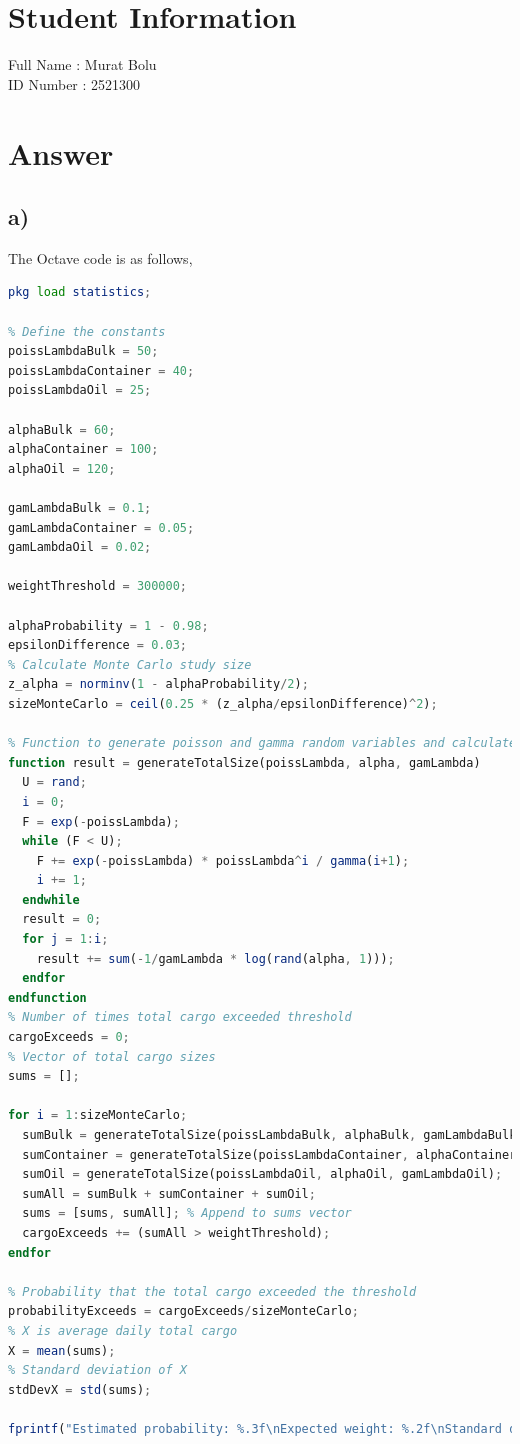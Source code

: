 \documentclass[12pt]{article}
\begin{document}
\section*{Student Information }
Full Name : Murat Bolu \\
ID Number : 2521300 \\

\section*{Answer}

\subsection*{a)}
\noindent
The Octave code is as follows,
\begin{lstlisting}[language=Octave]
% Load statistics module for inverse standard normal distribution
pkg load statistics;

% Define the constants
poissLambdaBulk = 50;
poissLambdaContainer = 40;
poissLambdaOil = 25;

alphaBulk = 60;
alphaContainer = 100;
alphaOil = 120;

gamLambdaBulk = 0.1;
gamLambdaContainer = 0.05;
gamLambdaOil = 0.02;

weightThreshold = 300000;

alphaProbability = 1 - 0.98;
epsilonDifference = 0.03;
% Calculate Monte Carlo study size
z_alpha = norminv(1 - alphaProbability/2);
sizeMonteCarlo = ceil(0.25 * (z_alpha/epsilonDifference)^2);

% Function to generate poisson and gamma random variables and calculate total cargo
function result = generateTotalSize(poissLambda, alpha, gamLambda)
  U = rand;
  i = 0;
  F = exp(-poissLambda);
  while (F < U);
    F += exp(-poissLambda) * poissLambda^i / gamma(i+1);
    i += 1;
  endwhile
  result = 0;
  for j = 1:i;
    result += sum(-1/gamLambda * log(rand(alpha, 1)));
  endfor
endfunction
% Number of times total cargo exceeded threshold
cargoExceeds = 0;
% Vector of total cargo sizes
sums = [];

for i = 1:sizeMonteCarlo;
  sumBulk = generateTotalSize(poissLambdaBulk, alphaBulk, gamLambdaBulk);
  sumContainer = generateTotalSize(poissLambdaContainer, alphaContainer, gamLambdaContainer);
  sumOil = generateTotalSize(poissLambdaOil, alphaOil, gamLambdaOil);
  sumAll = sumBulk + sumContainer + sumOil;
  sums = [sums, sumAll]; % Append to sums vector
  cargoExceeds += (sumAll > weightThreshold);
endfor

% Probability that the total cargo exceeded the threshold
probabilityExceeds = cargoExceeds/sizeMonteCarlo;
% X is average daily total cargo
X = mean(sums);
% Standard deviation of X
stdDevX = std(sums);

fprintf("Estimated probability: %.3f\nExpected weight: %.2f\nStandard deviation: %.2f\n", probabilityExceeds, X, stdDevX);
\end{lstlisting}
\end{document}
